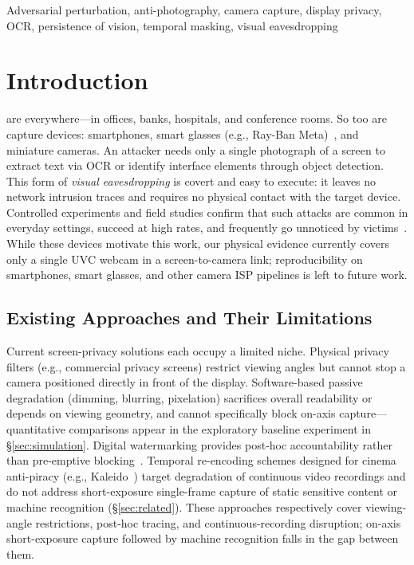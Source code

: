 \documentclass{ieeeaccess}
\begin{document}
\begin{keywords}
Adversarial perturbation, anti-photography, camera capture, display privacy, OCR, persistence of vision, temporal masking, visual eavesdropping
\end{keywords}

\titlepgskip=-21pt
\maketitle

\section{Introduction}
\label{sec:introduction}

 are everywhere---in offices, banks, hospitals, and conference rooms. So too are capture devices: smartphones, smart glasses (e.g., Ray-Ban Meta)~\cite{b_wang2026}, and miniature cameras. An attacker needs only a single photograph of a screen to extract text via OCR or identify interface elements through object detection. This form of \emph{visual eavesdropping} is covert and easy to execute: it leaves no network intrusion traces and requires no physical contact with the target device. Controlled experiments and field studies confirm that such attacks are common in everyday settings, succeed at high rates, and frequently go unnoticed by victims~\cite{b_ponemon2016,b_eiband2017}. While these devices motivate this work, our physical evidence currently covers only a single UVC webcam in a screen-to-camera link; reproducibility on smartphones, smart glasses, and other camera ISP pipelines is left to future work.

\subsection{Existing Approaches and Their Limitations}

Current screen-privacy solutions each occupy a limited niche.
Physical privacy filters (e.g., commercial privacy screens) restrict viewing angles but cannot stop a camera positioned directly in front of the display. Software-based passive degradation (dimming, blurring, pixelation) sacrifices overall readability or depends on viewing geometry, and cannot specifically block on-axis capture---quantitative comparisons appear in the exploratory baseline experiment in \S\ref{sec:simulation}. Digital watermarking provides post-hoc accountability rather than pre-emptive blocking~\cite{b_fang2019}. Temporal re-encoding schemes designed for cinema anti-piracy (e.g., Kaleido~\cite{b_kaleido2015}) target degradation of continuous video recordings and do not address short-exposure single-frame capture of static sensitive content or machine recognition (\S\ref{sec:related}). These approaches respectively cover viewing-angle restrictions, post-hoc tracing, and continuous-recording disruption; on-axis short-exposure capture followed by machine recognition falls in the gap between them.
\end{document}
